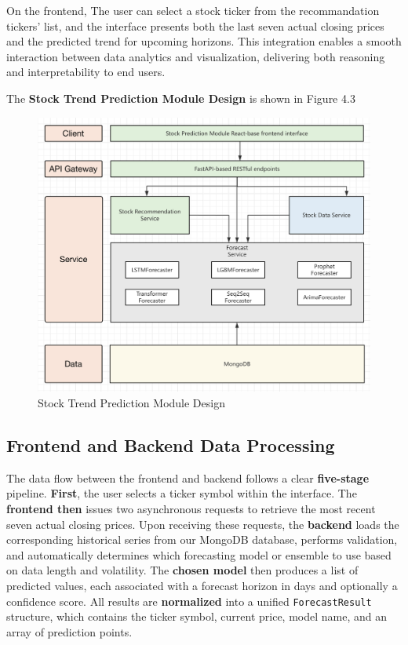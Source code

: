 On the frontend,  
The user can select a stock ticker from the recommandation tickers' list, and the interface presents both the last seven actual closing prices and the predicted trend for upcoming horizons.  
This integration enables a smooth interaction between data analytics and visualization, delivering both reasoning and interpretability to end users.

The \textbf{Stock Trend Prediction Module Design} is shown in Figure 4.3

\begin{figure}[ht!] 
	\centering
	\includegraphics[width=1\linewidth]{images/prediction/arch.png}
	\caption[system design]{Stock Trend Prediction Module Design}
\end{figure}


\subsection{Frontend and Backend Data Processing}

The data flow between the frontend and backend follows a clear \textbf{five-stage} pipeline.  
\textbf{First}, the user selects a ticker symbol within the interface.  
The \textbf{frontend then} issues two asynchronous requests to retrieve the most recent seven actual closing prices.  
Upon receiving these requests, the \textbf{backend} loads the corresponding historical series from our MongoDB database, performs validation, and automatically determines which forecasting model or ensemble to use based on data length and volatility.  
The \textbf{chosen model} then produces a list of predicted values, each associated with a forecast horizon in days and optionally a confidence score.  
All results are \textbf{normalized} into a unified \texttt{ForecastResult} structure, which contains the ticker symbol, current price, model name, and an array of prediction points.

